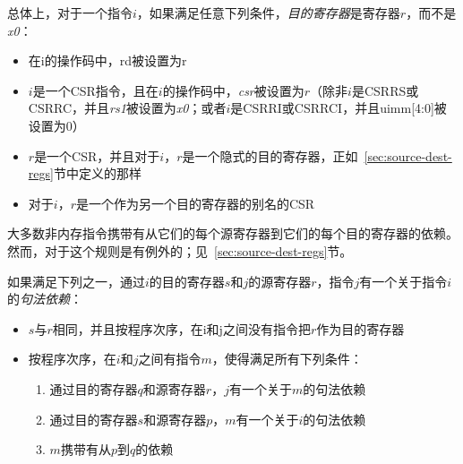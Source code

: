 总体上，对于一个指令$i$，如果满足任意下列条件，{\em 目的寄存器}是寄存器$r$，而不是{\em x0}：
\begin{itemize}
  \item 在i的操作码中，rd被设置为r  %
  \item $i$是一个CSR指令，且在$i$的操作码中，{\em csr}被设置为$r$（除非$i$是CSRRS或CSRRC，并且{\em rs1}被设置为{\em x0}；或者$i$是CSRRI或CSRRCI，并且uimm[4:0]被设置为0）  %
  \item $r$是一个CSR，并且对于$i$，$r$是一个隐式的目的寄存器，正如~\ref{sec:source-dest-regs}节中定义的那样  %
  \item 对于$i$，$r$是一个作为另一个目的寄存器的别名的CSR  %
\end{itemize}

大多数非内存指令携带有从它们的每个源寄存器到它们的每个目的寄存器的依赖。然而，对于这个规则是有例外的；见~\ref{sec:source-dest-regs}节。

如果满足下列之一，通过$i$的目的寄存器$s$和$j$的源寄存器$r$，指令$j$有一个关于指令$i$的{\em 句法依赖}：
\begin{itemize}
  \item $s$与$r$相同，并且按程序次序，在i和j之间没有指令把$r$作为目的寄存器  %
  \item 按程序次序，在$i$和$j$之间有指令$m$，使得满足所有下列条件： %
    \begin{enumerate}
      \item 通过目的寄存器$q$和源寄存器$r$，$j$有一个关于$m$的句法依赖  %
      \item 通过目的寄存器$s$和源寄存器$p$，$m$有一个关于$i$的句法依赖   %
      \item $m$携带有从$p$到$q$的依赖  %
    \end{enumerate}
\end{itemize}

